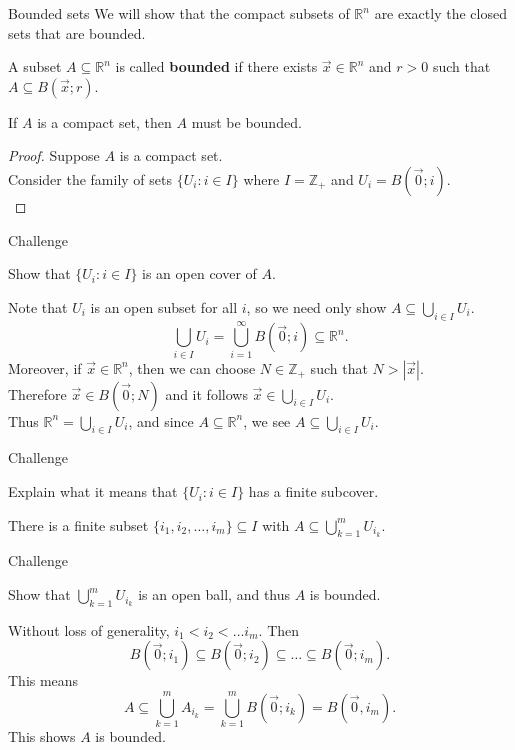 \documentclass{beamer}
\begin{document}
\begin{frame}{Bounded sets}
We will show that the compact subsets of $\mathbb{R}^n$ are exactly the closed sets that are bounded.
\begin{defn}
A subset $A\subseteq\mathbb{R}^n$ is called \textbf{bounded} if there exists $\vec x\in\mathbb{R}^n$ and $r > 0$ such that $A\subseteq B(\vec x; r)$.
\end{defn}
\begin{thm}
If $A$ is a compact set, then $A$ must be bounded.
\end{thm}
\begin{proof}
Suppose $A$ is a compact set.\\
Consider the family of sets $\{U_i: i\in I\}$ where $I=\mathbb{Z}_+$ and $U_i = B(\vec 0; i)$.\\
\end{proof}
\end{frame}

\begin{frame}{Challenge}
\begin{prob}
Show that $\{U_i: i\in I\}$ is an open cover of $A$.
\end{prob}
\begin{soln}
Note that $U_i$ is an open subset for all $i$, so we need only show $A\subseteq\bigcup_{i\in I} U_i$.\\
$$\bigcup_{i\in I} U_i = \bigcup_{i=1}^\infty B(\vec 0; i) \subseteq \mathbb{R}^n.$$
Moreover, if $\vec x\in \mathbb{R}^n$, then we can choose $N\in\mathbb{Z}_+$ such that $N > |\vec x|$.\\
Therefore $\vec x\in B(\vec 0; N)$ and it follows $\vec x\in \bigcup_{i\in I} U_i$. \\
Thus $\mathbb{R}^n = \bigcup_{i\in I} U_i$, and since $A\subseteq\mathbb{R}^n$, we see $A\subseteq \bigcup_{i\in I} U_i$.
\end{soln}
\end{frame}

\begin{frame}{Challenge}
\begin{prob}
Explain what it means that $\{U_i: i\in I\}$ has a finite subcover.
\end{prob}
\begin{soln}
There is a finite subset $\{i_1,i_2,\dots, i_m\}\subseteq I$ with $A\subseteq\bigcup_{k=1}^m U_{i_k}$.
\end{soln}
\end{frame}

\begin{frame}{Challenge}
\begin{prob}
Show that $\bigcup_{k=1}^m U_{i_k}$ is an open ball, and thus $A$ is bounded.
\end{prob}
\begin{soln}
Without loss of generality, $i_1 < i_2 < \dots i_m$.
Then
$$B(\vec 0; i_1) \subseteq B(\vec 0; i_2)\subseteq\dots\subseteq B(\vec 0; i_m).$$
This means 
$$A\subseteq \bigcup_{k=1}^m A_{i_k} = \bigcup_{k=1}^m B(\vec 0; i_k) = B(\vec 0,i_m).$$
This shows $A$ is bounded.
\end{soln}
\end{frame}
\end{document}
